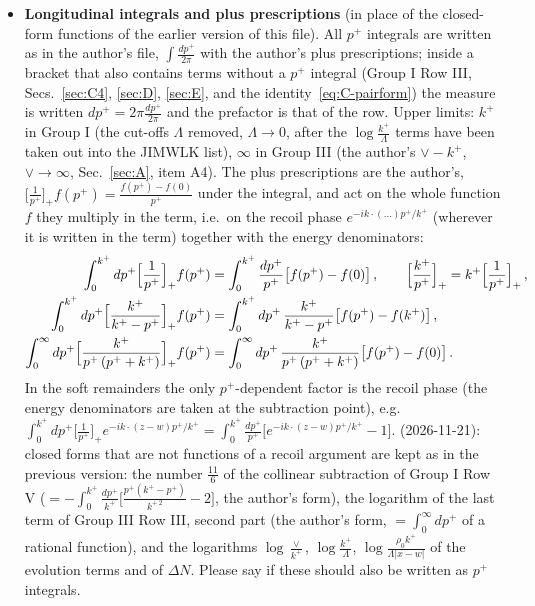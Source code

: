 \begin{itemize}
\item \textbf{Longitudinal integrals and plus prescriptions} (in place of the closed-form functions of the earlier version of this file). All $p^{+}$ integrals are written as in the author's file, $\int\frac{dp^{+}}{2\pi}$ with the author's plus prescriptions; inside a bracket that also contains terms without a $p^{+}$ integral (Group I Row III, Secs.~\ref{sec:C4}, \ref{sec:D}, \ref{sec:E}, and the identity~\eqref{eq:C-pairform}) the measure is written $dp^{+}=2\pi\frac{dp^{+}}{2\pi}$ and the prefactor is that of the row. Upper limits: $k^{+}$ in Group I (the cut-offs $\Lambda$ removed, $\Lambda\to0$, after the $\log\frac{k^{+}}{\Lambda}$ terms have been taken out into the JIMWLK list), $\infty$ in Group III (the author's $\vee-k^{+}$, $\vee\to\infty$, Sec.~\ref{sec:A}, item A4). The plus prescriptions are the author's, $\big[\frac{1}{p^{+}}\big]_{+}f(p^{+})=\frac{f(p^{+})-f(0)}{p^{+}}$ under the integral, and act on the whole function $f$ they multiply in the term, i.e.\ on the recoil phase $e^{-ik\cdot(\dots)p^{+}/k^{+}}$ (wherever it is written in the term) together with the energy denominators:
\begin{align}\label{eq:plus}
\int_{0}^{k^{+}}dp^{+}\Big[\frac{1}{p^{+}}\Big]_{+}f(p^{+})&=\int_{0}^{k^{+}}\frac{dp^{+}}{p^{+}}\big[f(p^{+})-f(0)\big]\,,\qquad\Big[\frac{k^{+}}{p^{+}}\Big]_{+}=k^{+}\Big[\frac{1}{p^{+}}\Big]_{+}\,,\notag\\
\int_{0}^{k^{+}}dp^{+}\Big[\frac{k^{+}}{k^{+}-p^{+}}\Big]_{+}f(p^{+})&=\int_{0}^{k^{+}}dp^{+}\,\frac{k^{+}}{k^{+}-p^{+}}\big[f(p^{+})-f(k^{+})\big]\,,\notag\\
\int_{0}^{\infty}dp^{+}\Big[\frac{k^{+}}{p^{+}\,(p^{+}+k^{+})}\Big]_{+}f(p^{+})&=\int_{0}^{\infty}dp^{+}\,\frac{k^{+}}{p^{+}\,(p^{+}+k^{+})}\big[f(p^{+})-f(0)\big]\,.
\end{align}
In the soft remainders the only $p^{+}$-dependent factor is the recoil phase (the energy denominators are taken at the subtraction point), e.g.\ $\int_{0}^{k^{+}}dp^{+}\big[\frac{1}{p^{+}}\big]_{+}e^{-ik\cdot(z-w)p^{+}/k^{+}}=\int_{0}^{k^{+}}\frac{dp^{+}}{p^{+}}\big[e^{-ik\cdot(z-w)p^{+}/k^{+}}-1\big]$. {\color{red}\NOTE{} (2026-11-21): closed forms that are not functions of a recoil argument are kept as in the previous version: the number $\frac{11}{6}$ of the collinear subtraction of Group I Row V ($=-\int_{0}^{k^{+}}\frac{dp^{+}}{k^{+}}\big[\frac{p^{+}(k^{+}-p^{+})}{k^{+\,2}}-2\big]$, the author's form), the logarithm of the last term of Group III Row III, second part (the author's form, $=\int_{0}^{\infty}dp^{+}$ of a rational function), and the logarithms $\log\frac{\vee}{k^{+}}$, $\log\frac{k^{+}}{\Lambda}$, $\log\frac{\rho_{0}k^{+}}{\Lambda|x-w|}$ of the evolution terms and of $\Delta N$. Please say if these should also be written as $p^{+}$ integrals.}

\end{itemize}
